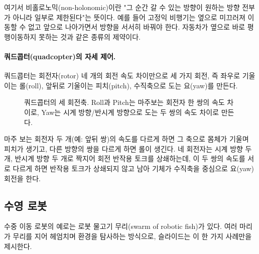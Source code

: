 여기서 비홀로노믹(non-holonomic)이란 "그 순간 갈 수 있는 방향이 원하는 방향
전부가 아니라 일부로 제한된다"는 뜻이다. 예를 들어 고정익 비행기는 옆으로 미끄러져
이동할 수 없고 앞으로 나아가면서 방향을 서서히 바꿔야 한다. 자동차가 옆으로 바로
평행이동하지 못하는 것과 같은 종류의 제약이다.

\paragraph{쿼드콥터(quadcopter)의 자세 제어.}
쿼드콥터는 회전자(rotor) 네 개의 회전 속도 차이만으로 세 가지 회전, 즉
좌우로 기울이는 롤(roll), 앞뒤로 기울이는 피치(pitch), 수직축으로 도는
요(yaw)를 만든다.

\begin{figure}[ht]
\centering
{}
\caption{쿼드콥터의 세 회전축. Roll과 Pitch는 마주보는 회전자 한 쌍의 속도
  차이로, Yaw는 시계 방향/반시계 방향으로 도는 두 쌍의 속도 차이로 만든다.}
\label{fig:lec02-quadcopter}
\end{figure}

마주 보는 회전자 두 개(예: 앞뒤 쌍)의 속도를 다르게 하면 그 축으로 몸체가
기울며 피치가 생기고, 다른 방향의 쌍을 다르게 하면 롤이 생긴다. 네 회전자는
시계 방향 두 개, 반시계 방향 두 개로 짝지어 회전 반작용 토크를 상쇄하는데, 이
두 쌍의 속도를 서로 다르게 하면 반작용 토크가 상쇄되지 않고 남아 기체가
수직축을 중심으로 요(yaw) 회전을 한다.

\subsection{수영 로봇}
\label{sec:lec02-swimming}

수중 이동 로봇의 예로는 로봇 물고기 무리(swarm of robotic fish)가 있다. 여러
마리가 무리를 지어 헤엄치며 환경을 탐사하는 방식으로, 슬라이드는 이 한 가지
사례만을 제시한다.

